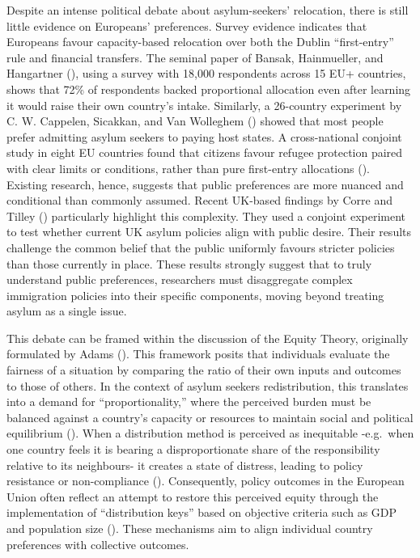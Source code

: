 \documentclass[
  12pt,
  a4paper,
]{article}
\begin{document}
Despite an intense political debate about asylum-seekers' relocation, there is still little evidence on Europeans' preferences. Survey evidence indicates that Europeans favour capacity-based relocation over both the Dublin ``first-entry'' rule and financial transfers. The seminal paper of Bansak, Hainmueller, and Hangartner (), using a survey with 18,000 respondents across 15 EU+ countries, shows that 72\% of respondents backed proportional allocation even after learning it would raise their own country's intake. Similarly, a 26-country experiment by C. W. Cappelen, Sicakkan, and Van Wolleghem () showed that most people prefer admitting asylum seekers to paying host states. A cross-national conjoint study in eight EU countries found that citizens favour refugee protection paired with clear limits or conditions, rather than pure first-entry allocations (). Existing research, hence, suggests that public preferences are more nuanced and conditional than commonly assumed. Recent UK-based findings by Corre and Tilley () particularly highlight this complexity. They used a conjoint experiment to test whether current UK asylum policies align with public desire. Their results challenge the common belief that the public uniformly favours stricter policies than those currently in place. These results strongly suggest that to truly understand public preferences, researchers must disaggregate complex immigration policies into their specific components, moving beyond treating asylum as a single issue.

This debate can be framed within the discussion of the Equity Theory, originally formulated by Adams (). This framework posits that individuals evaluate the fairness of a situation by comparing the ratio of their own inputs and outcomes to those of others. In the context of asylum seekers redistribution, this translates into a demand for ``proportionality,'' where the perceived burden must be balanced against a country's capacity or resources to maintain social and political equilibrium (). When a distribution method is perceived as inequitable -e.g.~when one country feels it is bearing a disproportionate share of the responsibility relative to its neighbours- it creates a state of distress, leading to policy resistance or non-compliance (). Consequently, policy outcomes in the European Union often reflect an attempt to restore this perceived equity through the implementation of ``distribution keys'' based on objective criteria such as GDP and population size (). These mechanisms aim to align individual country preferences with collective outcomes.
\end{document}
